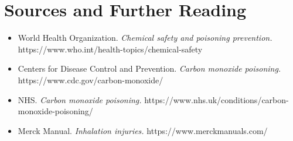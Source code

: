 \section*{Sources and Further Reading}
\begin{itemize}
    \item World Health Organization. \textit{Chemical safety and poisoning prevention.} https://www.who.int/health-topics/chemical-safety
    \item Centers for Disease Control and Prevention. \textit{Carbon monoxide poisoning.} https://www.cdc.gov/carbon-monoxide/
    \item NHS. \textit{Carbon monoxide poisoning.} https://www.nhs.uk/conditions/carbon-monoxide-poisoning/
    \item Merck Manual. \textit{Inhalation injuries.} https://www.merckmanuals.com/
\end{itemize}
